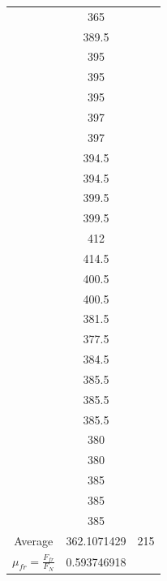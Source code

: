 \documentclass[12pt]{article}
\begin{document}
\begin{table}
\begin{tabular}[t]{| c c c |}
                & 365           &           \\
                & 389.5         &           \\
                & 395           &           \\
                & 395           &           \\
                & 395           &           \\
                & 397           &           \\
                & 397           &           \\
                & 394.5         &           \\
                & 394.5         &           \\
                & 399.5         &           \\
                & 399.5         &           \\
                & 412           &           \\
                & 414.5         &           \\
                & 400.5         &           \\
                & 400.5         &           \\
                & 381.5         &           \\
                & 377.5         &           \\
                & 384.5         &           \\
                & 385.5         &           \\
                & 385.5         &           \\
                & 385.5         &           \\
                & 380           &           \\
                & 380           &           \\
                & 385           &           \\
                & 385           &           \\
                & 385           &           \\
        \hline
        Average & 362.1071429   & 215       \\
        \hline
        $\mu_{fr} = \frac{F_{fr}}{F_{N}}$ & 0.593746918 & \\
        \hline
    \end{tabular}
\end{table}
\end{document}
